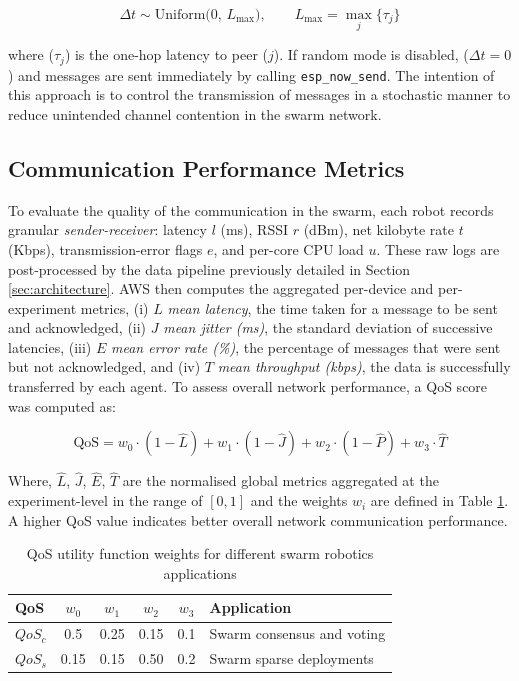 \documentclass[conference]{IEEEtran}
\begin{document}
\begin{equation}\label{alg:transmission_freq}
\Delta t \sim \mathrm{Uniform}\bigl(0,\,L_{\max}\bigr), 
\qquad
L_{\max} = \max_{j}\{\tau_{j}\}
\end{equation}

where ($\tau_{j}$) is the one-hop latency to peer ($j$). If random mode is disabled, ($\Delta t = 0$) and messages are sent immediately by calling \texttt{esp\_now\_send}. The intention of this approach is to control the transmission of messages in a stochastic manner to reduce unintended channel contention in the swarm network.

\subsection{Communication Performance Metrics}\label{sec:evaluation-metrics}

To evaluate the quality of the communication in the swarm, each robot records granular \emph{sender-receiver}: latency $l$ (ms), RSSI $r$ (dBm), net kilobyte rate $t$ (Kbps), transmission-error flags $e$, and per-core CPU load $u$. These raw logs are post-processed by the data pipeline previously detailed in Section \ref{sec:architecture}. AWS then computes the aggregated per-device and per-experiment metrics, (i) $L$ \emph{mean latency}, the time taken for a message to be sent and acknowledged, (ii) $J$ \emph{mean jitter (ms)}, the standard deviation of successive latencies, (iii) $E$ \emph{mean error rate (\%)}, the percentage of messages that were sent but not acknowledged, and (iv) $T$ \emph{mean throughput (kbps)}, the data is successfully transferred by each agent. To assess overall network performance, a QoS score was computed as:

\begin{equation}
\mathrm{QoS} = w_0 \cdot (1 - \hat{L}) + w_1 \cdot (1 - \hat{J}) + w_2 \cdot (1 - \hat{P}) + w_3 \cdot \hat{T}
\end{equation}

Where, $\hat{L}$, $\hat{J}$, $\hat{E}$, $\hat{T}$ are the normalised global metrics aggregated at the experiment-level in the range of $[0,1]$ and the weights $w_i$ are defined in Table \ref{tab:qos}. A higher QoS value indicates better overall network communication performance.

\begin{table}[H]
\centering
\caption{QoS utility function weights for different swarm robotics applications}
\label{tab:qos}
  \begin{tabular}{@{} lcccc p{3.5cm} @{}}
  \toprule
  \textbf{QoS} & \textbf{$w_0$} & \textbf{$w_1$} & \textbf{$w_2$} & \textbf{$w_3$} & \textbf{Application} \\
  \midrule
  $QoS_c$      & 0.5  & 0.25   & 0.15   & 0.1     & Swarm consensus and voting     \\
  $QoS_s$      & 0.15 & 0.15   & 0.50   & 0.2     & Swarm sparse deployments       \\
  \bottomrule
  \end{tabular}
\end{table}
\end{document}
